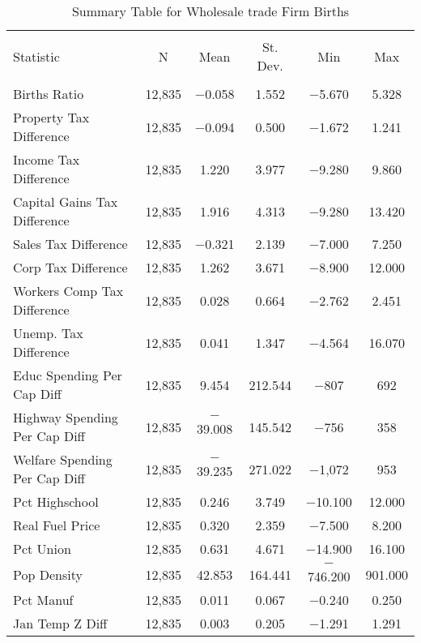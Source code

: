 
\begin{table}[!htbp] \centering 
  \caption{Summary Table for  Wholesale trade Firm Births} 
  \label{42summary} 
\begin{tabular}{@{\extracolsep{5pt}}lccccc} 
\\[-1.8ex]\hline 
\hline \\[-1.8ex] 
Statistic & \multicolumn{1}{c}{N} & \multicolumn{1}{c}{Mean} & \multicolumn{1}{c}{St. Dev.} & \multicolumn{1}{c}{Min} & \multicolumn{1}{c}{Max} \\ 
\hline \\[-1.8ex] 
Births Ratio & 12,835 & $-$0.058 & 1.552 & $-$5.670 & 5.328 \\ 
Property Tax Difference & 12,835 & $-$0.094 & 0.500 & $-$1.672 & 1.241 \\ 
Income Tax Difference & 12,835 & 1.220 & 3.977 & $-$9.280 & 9.860 \\ 
Capital Gains Tax Difference & 12,835 & 1.916 & 4.313 & $-$9.280 & 13.420 \\ 
Sales Tax Difference & 12,835 & $-$0.321 & 2.139 & $-$7.000 & 7.250 \\ 
Corp Tax Difference & 12,835 & 1.262 & 3.671 & $-$8.900 & 12.000 \\ 
Workers Comp Tax Difference & 12,835 & 0.028 & 0.664 & $-$2.762 & 2.451 \\ 
Unemp. Tax Difference & 12,835 & 0.041 & 1.347 & $-$4.564 & 16.070 \\ 
Educ Spending Per Cap Diff & 12,835 & 9.454 & 212.544 & $-$807 & 692 \\ 
Highway Spending Per Cap Diff & 12,835 & $-$39.008 & 145.542 & $-$756 & 358 \\ 
Welfare Spending Per Cap Diff & 12,835 & $-$39.235 & 271.022 & $-$1,072 & 953 \\ 
Pct Highschool & 12,835 & 0.246 & 3.749 & $-$10.100 & 12.000 \\ 
Real Fuel Price & 12,835 & 0.320 & 2.359 & $-$7.500 & 8.200 \\ 
Pct Union & 12,835 & 0.631 & 4.671 & $-$14.900 & 16.100 \\ 
Pop Density & 12,835 & 42.853 & 164.441 & $-$746.200 & 901.000 \\ 
Pct Manuf & 12,835 & 0.011 & 0.067 & $-$0.240 & 0.250 \\ 
Jan Temp Z Diff & 12,835 & 0.003 & 0.205 & $-$1.291 & 1.291 \\ 

\end{tabular}
\end{table}
